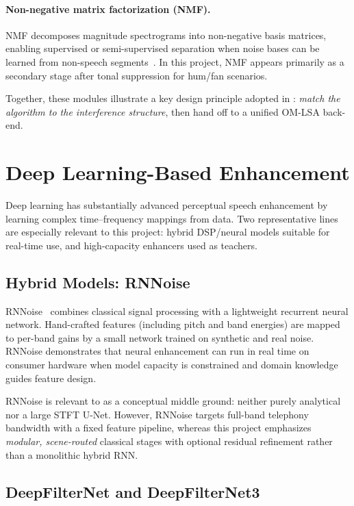 \paragraph{Non-negative matrix factorization (NMF).}
NMF decomposes magnitude spectrograms into non-negative basis matrices, enabling supervised or semi-supervised separation when noise bases can be learned from non-speech segments~\cite{loizou2013}. In this project, NMF appears primarily as a secondary stage after tonal suppression for hum/fan scenarios.

Together, these modules illustrate a key design principle adopted in \projectshort{}: \emph{match the algorithm to the interference structure}, then hand off to a unified OM-LSA back-end.

\section{Deep Learning-Based Enhancement}
\label{sec:deep_learning}

Deep learning has substantially advanced perceptual speech enhancement by learning complex time--frequency mappings from data. Two representative lines are especially relevant to this project: hybrid DSP/neural models suitable for real-time use, and high-capacity enhancers used as teachers.

\subsection{Hybrid Models: RNNoise}
\label{sec:rnnoise}

RNNoise~\cite{rnnoise2018} combines classical signal processing with a lightweight recurrent neural network. Hand-crafted features (including pitch and band energies) are mapped to per-band gains by a small network trained on synthetic and real noise. RNNoise demonstrates that neural enhancement can run in real time on consumer hardware when model capacity is constrained and domain knowledge guides feature design.

RNNoise is relevant to \projectshort{} as a conceptual middle ground: neither purely analytical nor a large STFT U-Net. However, RNNoise targets full-band telephony bandwidth with a fixed feature pipeline, whereas this project emphasizes \emph{modular, scene-routed} classical stages with optional residual refinement rather than a monolithic hybrid RNN.

\subsection{DeepFilterNet and DeepFilterNet3}
\label{sec:deepfilternet}


